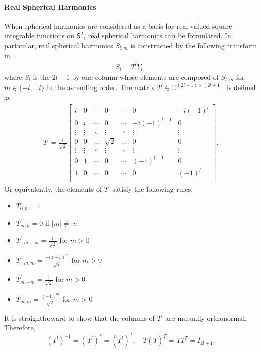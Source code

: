 \documentclass[onecolumn,11pt]{IEEEtran}
\newcommand{\Cp}{\ensuremath{\mathbb{C}}}
\newcommand{\Sph}{\ensuremath{\mathsf{S}}}
\begin{document}
\paragraph{Real Spherical Harmonics}

When spherical harmonics are considered as a basis for real-valued square-integrable functions on $\Sph^2$, real spherical harmonics can be formulated. 
In particular, real spherical harmonics $S_{l,m}$ is constructed by the following transform in~\cite{BlaFloJMS97}
\begin{align}
    S_l = T^l Y_l,\label{eqn:YtoS}
\end{align}
where $S_l$ is the $2l+1$-by-one column whose elements are composed of $S_{l,m}$ for $m\in\{-l,\ldots l\}$ in the ascending order. 
The matrix $T^l\in\Cp^{(2l+1)\times(2l+1)}$ is defined as
\begin{align*}
    T^l=\frac{1}{\sqrt{2}}
    \begin{bmatrix}
        i & 0 & \cdots & 0 & \cdots & 0 & -i(-1)^l\\
        0 & i & \cdots & 0 & \cdots & -i(-1)^{l-1} & 0 \\
        \vdots & \vdots & \ddots &\vdots & \iddots & \vdots & \vdots\\
        0 & 0 & \hdots & \sqrt{2} & \hdots & 0 & 0 \\
        \vdots & \vdots & \iddots &\vdots & \ddots & \vdots & \vdots\\
        0 & 1 & \cdots & 0 & \cdots & (-1)^{l-1} & 0 \\
        1 & 0 & \cdots & 0 & \cdots & 0 & (-1)^l\\
    \end{bmatrix}.
\end{align*}
Or equivalently, the elements of $T^l$ satisfy the following rules.
\begin{itemize}
    \item $T^l_{0,0}=1$
    \item $T^l_{m,n}=0$ if $|m|\neq|n|$
    \item $T^l_{-m,-m} = \frac{i}{\sqrt{2}}$ for $m>0$
    \item $T^l_{-m,m}=\frac{-i(-1)^m}{\sqrt{2}}$ for $m>0$
    \item $T^l_{m,-m}=\frac{1}{\sqrt{2}}$ for $m>0$
    \item $T^l_{m,m}=\frac{(-1)^m}{\sqrt{2}} $ for $m>0$
\end{itemize}
It is straightforward to show that the columns of $T^l$ are mutually orthonormal. 
Therefore,
\[
    (T^l)^{-1} = (T^l)^* = (\overline{T^l})^T,\quad T (\overline T)^T= \overline{T} T^T = I_{2l+1}.
\]
\end{document}
